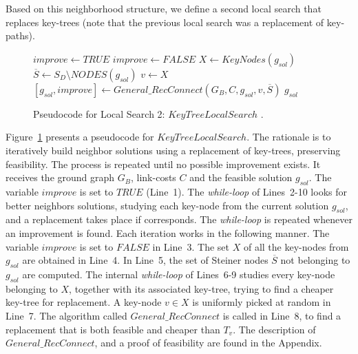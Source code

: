 Based on this neighborhood structure, we define a second local search that replaces key-trees 
(note that the previous local search was a replacement of key-paths). 


\begin{figure}[H]
\begin{algorithm}[H]
\caption{$g_{sol} = KeyTreeLocalSearch(G_B,C,g_{sol})$}
\begin{algorithmic}[1]
\STATE $improve \leftarrow TRUE$
\STATE $improve \leftarrow FALSE$
\STATE $ X \leftarrow KeyNodes(g_{sol})$ 
\STATE $\overline{S} \leftarrow S_D \setminus NODES(g_{sol})$
\STATE $v \leftarrow X$ 
\STATE $[g_{sol},improve] \leftarrow General\_RecConnect(G_B,C,g_{sol},v,\overline{S})$
\ENDWHILE
\ENDWHILE
\RETURN $g_{sol}$
\end{algorithmic}
\end{algorithm}
\caption{Pseudocode for Local Search 2: $KeyTreeLocalSearch$ \cite{11}.\label{alg-ktls}}
\end{figure}

Figure~\ref{alg-ktls} presents a pseudocode for $KeyTreeLocalSearch$. 
The rationale is to iteratively build neighbor solutions using a replacement of key-trees, preserving 
feasibility. The process is repeated until no possible improvement exists. 
It receives the ground graph $G_B$, link-costs $C$ and the feasible solution $g_{sol}$. 
The variable $improve$ is set to $TRUE$ (Line~1). The \textit{while-loop} of Lines~2-10 looks 
for better neighbors solutions, studying each key-node from the current solution $g_{sol}$, and 
a replacement takes place if corresponds. The \textit{while-loop} is repeated whenever an improvement is 
found. Each iteration works in the following manner. The variable $improve$ is set to $FALSE$ in Line~3. 
The set $X$ of all the key-nodes from $g_{sol}$ are obtained in Line~4. In Line~5, 
the set of Steiner nodes $\overline{S}$ not belonging to $g_{sol}$ are computed. 
The internal \textit{while-loop} of Lines~6-9 studies every key-node belonging to $X$, together with 
its associated key-tree, trying to find a cheaper key-tree for replacement. 
A key-node $v \in X$ is uniformly picked at random in Line~7. The algorithm 
called $General\_RecConnect$ is called in Line~8, to find a replacement that is both feasible and cheaper than $T_v$. The description of $General\_RecConnect$, and a proof of feasibility are found in the Appendix. 

